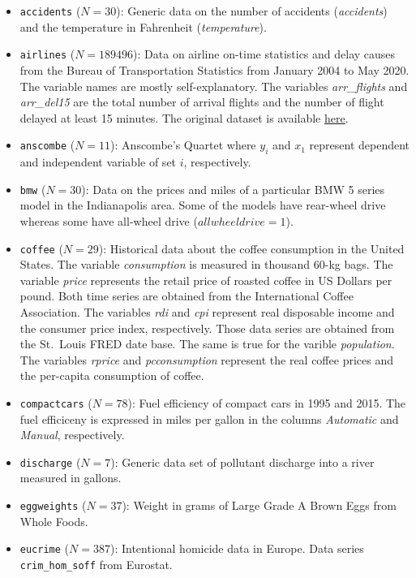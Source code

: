 \documentclass[
]{article}
\begin{document}
\begin{itemize}
\item
  \texttt{accidents} (\(N=30\)): Generic data on the number of accidents (\emph{accidents}) and the temperature in Fahrenheit (\emph{temperature}).
\item
  \texttt{airlines} (\(N=189496\)): Data on airline on-time statistics and delay causes from the Bureau of Transportation Statistics from January 2004 to May 2020. The variable names are mostly self-explanatory. The variables \emph{arr\_flights} and \emph{arr\_del15} are the total number of arrival flights and the number of flight delayed at least 15 minutes. The original dataset is available \href{https://www.transtats.bts.gov/ot_delay/ot_delaycause1.asp}{here}.
\item
  \texttt{anscombe} (\(N=11\)): Anscombe's Quartet where \(y_i\) and \(x_1\) represent dependent and independent variable of set \(i\), respectively.
\item
  \texttt{bmw} (\(N=30\)): Data on the prices and miles of a particular BMW 5 series model in the Indianapolis area. Some of the models have rear-wheel drive whereas some have all-wheel drive (\(allwheeldrive=1\)).
\item
  \texttt{coffee} (\(N=29\)): Historical data about the coffee consumption in the United States. The variable \emph{consumption} is measured in thousand 60-kg bags. The variable \emph{price} represents the retail price of roasted coffee in US Dollars per pound. Both time series are obtained from the International Coffee Association. The variables \emph{rdi} and \emph{cpi} represent real disposable income and the consumer price index, respectively. Those data series are obtained from the St.~Louis FRED date base. The same is true for the varible \emph{population}. The variables \emph{rprice} and \emph{pcconsumption} represent the real coffee prices and the per-capita consumption of coffee.
\item
  \texttt{compactcars} (\(N=78\)): Fuel efficiency of compact cars in 1995 and 2015. The fuel efficiceny is expressed in miles per gallon in the columns \emph{Automatic} and \emph{Manual}, respectively.
\item
  \texttt{discharge} (\(N=7\)): Generic data set of pollutant discharge into a river measured in gallons.
\item
  \texttt{eggweights} (\(N=37\)): Weight in grams of Large Grade A Brown Eggs from Whole Foods.
\item
  \texttt{eucrime} (\(N=387\)): Intentional homicide data in Europe. Data series \texttt{crim\_hom\_soff} from Eurostat.

\end{itemize}
\end{document}
